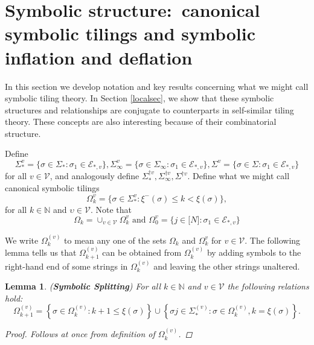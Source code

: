 \documentclass{amsproc}
\theoremstyle{plain}
\newtheorem{lemma}{Lemma}
\theoremstyle{definition}
\numberwithin{equation}{section}
\begin{document}
\section{\label{symbolicsec}Symbolic structure:\ canonical symbolic tilings
and symbolic inflation and deflation}

In this section we develop notation and key results concerning what we might
call symbolic tiling theory. In Section \ref{localsec}, we show that these
symbolic structures and relationships are conjugate to counterparts in
self-similar tiling theory. These concepts are also interesting because of
their combinatorial structure.

Define 
\begin{equation*}
\Sigma_{\ast}^{v}=\{\sigma\in\Sigma_{\ast}:\sigma_{1}\in\mathcal{E}_{\ast
,v}\},\Sigma_{\infty}^{v}=\{\sigma\in\Sigma_{\infty}:\sigma_{1}\in \mathcal{E%
}_{\ast,v}\},\Sigma^{v}=\{\sigma\in\Sigma:\sigma_{1}\in \mathcal{E}%
_{\ast,v}\}
\end{equation*}
for all $v\in\mathcal{V}$, and analogously define $\Sigma_{\ast}^{\dag
v},\Sigma_{\infty}^{\dag v},\Sigma^{\dag v}.$ Define what we might call
canonical symbolic tilings 
\begin{equation*}
\Omega_{k}^{v}=\{\sigma\in\Sigma_{\ast}^{v}:\xi^{-}(\sigma)\leq k<\xi
(\sigma)\},
\end{equation*}
for all $k\in\mathbb{N}$ and $\upsilon\in\mathcal{V}$. Note that 
\begin{equation*}
\Omega_{k}=\cup_{v\in\mathcal{V}}\Omega_{k}^{v}\text{ and }%
\Omega_{0}^{v}=\{j\in\lbrack N]:\sigma_{1}\in\mathcal{E}_{\ast,v}\}
\end{equation*}

We write $\Omega_{k}^{(v)}$ to mean any one of the sets $\Omega_{k}$ and $%
\Omega_{k}^{v}$ for $v\in\mathcal{V}$. The following lemma tells us that $%
\Omega_{k+1}^{(v)}$ can be obtained from $\Omega_{k}^{(v)}$ by adding
symbols to the right-hand end of some strings in $\Omega_{k}^{(v)}$ and
leaving the other strings unaltered.

\begin{lemma}
\label{lemma:split}(\textbf{Symbolic Splitting}) For all $k\in\mathbb{N}$
and $v\in\mathcal{V}$ the following relations hold:%
\begin{equation*}
\Omega_{k+1}^{(v)}=\left\{ \sigma\in\Omega_{k}^{(v)}:k+1\leq\xi\left(
\sigma\right) \right\} \cup\left\{ \sigma j\in\Sigma_{\ast}^{\left( v\right)
}:\sigma\in\Omega_{k}^{(v)},k=\xi\left( \sigma\right) \right\} \text{.}
\end{equation*}

\begin{proof}
Follows at once from definition of $\Omega_{k}^{(v)}$.
\end{proof}
\end{lemma}
\end{document}
